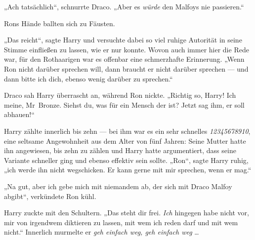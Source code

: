 „Ach tatsächlich“, schnurrte Draco.
„Aber es \emph{würde} den Malfoys nie passieren.“

Rons Hände ballten sich zu Fäusten.

„Das reicht“, sagte Harry und versuchte dabei so viel ruhige Autorität in seine Stimme einfließen zu lassen, wie er nur konnte. Wovon auch immer hier die Rede war, für den Rothaarigen war es offenbar eine schmerzhafte Erinnerung.
„Wenn Ron nicht darüber sprechen will, dann braucht er nicht darüber sprechen — und dann bitte ich dich, ebenso wenig darüber zu sprechen.“

Draco sah Harry überrascht an, während Ron nickte.
„Richtig so, Harry! Ich meine, Mr~Bronze. Siehst du, was für ein Mensch der ist? Jetzt sag ihm, er soll abhauen!“

Harry zählte innerlich bis zehn — bei ihm war es ein sehr schnelles \emph{12345678910}, eine seltsame Angewohnheit aus dem Alter von fünf Jahren: Seine Mutter hatte ihn angewiesen, bis zehn zu zählen und Harry hatte argumentiert, dass seine Variante schneller ging und ebenso effektiv sein sollte.
„Ron“, sagte Harry ruhig, „ich werde ihn nicht wegschicken. Er kann gerne mit mir sprechen, wenn er mag.“

„Na gut, aber ich gebe mich mit niemandem ab, der sich mit Draco Malfoy abgibt“, verkündete Ron kühl.

Harry zuckte mit den Schultern.
„Das steht dir frei. \emph{Ich} hingegen habe nicht vor, mir von irgendwem diktieren zu lassen, mit wem ich reden darf und mit wem nicht.“ Innerlich murmelte er \emph{geh einfach weg, geh einfach weg} …

